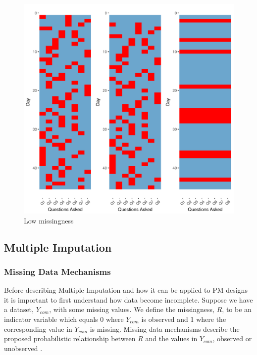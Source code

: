 \documentclass{svjour3}\usepackage[]{graphicx}\usepackage[]{color}
\makeatletter
\def\maxwidth{ %
  \ifdim\Gin@nat@width>\linewidth
    \linewidth
  \else
    \Gin@nat@width
  \fi
}
\newenvironment{knitrout}{}{} %
\makeatother
\begin{document}
\begin{knitrout}
\color{fgcolor}\begin{figure}[H]
\includegraphics[width=\maxwidth]{figure/formillustration-1} \caption[Low missingness]{Low missingness}\label{fig:formillustration}
\end{figure}


\end{knitrout}

\subsection{Multiple Imputation}
\label{sec:1.3}
\subsubsection{Missing Data Mechanisms}
\label{sec:1.3.1}
Before describing Multiple Imputation and how it can be applied to PM designs it is important to first understand how data become incomplete. Suppose we have a dataset, $Y_{com}$, with some missing values. We define the missingness, $R$, to be an indicator variable which equals 0 where $Y_{com}$ is observed and 1 where the corresponding value in $Y_{com}$ is missing. Missing data mechanisms describe the proposed probabilistic relationship between $R$ and the values in $Y_{com}$, observed or unobserved \citep{little2014statistical}. \par
\end{document}
